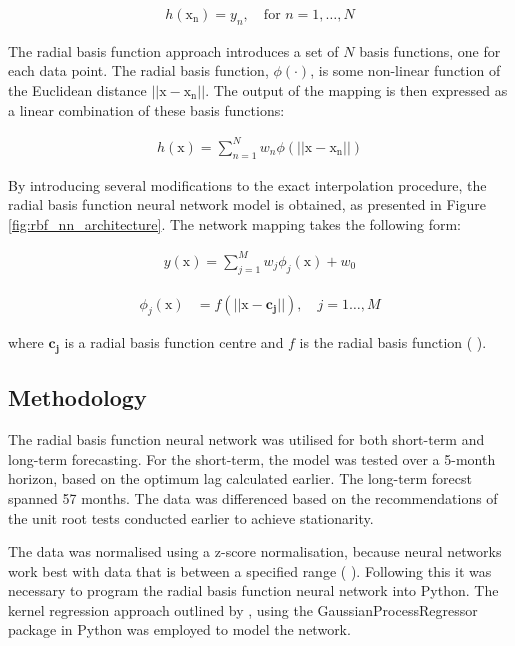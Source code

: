 \documentclass[11pt,a4paper]{article}
\newcommand{\citeboth}[1]{\citeauthor{#1} \citep{#1}}
\begin{document}
\begin{align}
  h(\boldsymbol{\mathrm{x_n}}) = y_n, \quad \text{for } n = 1, \ldots, N
\end{align}

The radial basis function approach 
introduces a set of $N$ basis functions, one for each 
data point. The radial basis function, $\phi(\cdot)$, is some non-linear function of the Euclidean distance
$||\boldsymbol{\mathrm{x}} - \boldsymbol{\mathrm{x_n}}||$. The output of the mapping is then expressed as a linear combination of these basis functions:

\begin{align}
    h(\boldsymbol{\mathrm{x}}) = \sum_{n=1}^{N} w_n \phi(||\boldsymbol{\mathrm{x}} - \boldsymbol{\mathrm{x_n}}||)
\end{align}

By introducing several modifications to the exact interpolation 
procedure, the radial basis function neural network
model is obtained, as presented in Figure \ref{fig:rbf_nn_architecture}. 
The network mapping takes the following form:

\begin{align}
    y(\boldsymbol{\mathrm{x}}) =  \sum_{j=1}^{M} w_{j} \phi_j(\boldsymbol{\mathrm{x}}) + w_{0}
\end{align}



\begin{align}
    \phi_j(\boldsymbol{\mathrm{x}})  &= f(||\boldsymbol{\mathrm{x}-c_j}||), \quad{j=1\ldots,M}
\end{align}

where $\boldsymbol{c_j}$ is a radial basis function centre and $f$ is the radial basis function (\citeboth{bishop1995}). 


\subsection{Methodology}

The radial basis function neural network was utilised for both short-term and long-term 
forecasting. For the short-term, 
the model was tested over a 5-month horizon, based on the optimum lag calculated earlier. 
The long-term forecst spanned 57 months. 
The data was differenced based on the recommendations of the 
unit root tests conducted earlier to achieve stationarity. 

The data was normalised using a z-score normalisation, because neural networks work best with data
that is between a specified range (\citeboth{mendelsohn1993}). Following this 
it was necessary to program the radial basis function neural network into Python. The kernel regression approach outlined by 
\citeboth{bishop1995}, using the GaussianProcessRegressor package in Python was employed to model the network.
\end{document}
